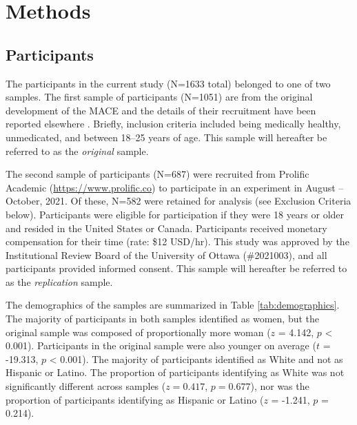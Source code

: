 \documentclass[letterpaper,man,natbib,longtable,floatsintext,12pt]{apa6}
\begin{document}
\section{Methods}

\subsection{Participants}

The participants in the current study (N=1633 total) belonged to one of two samples. The first sample of participants (N=1051) are from the original development of the MACE and the details of their recruitment have been reported elsewhere \citep{teicher2015maltreatment}. Briefly, inclusion criteria included being medically healthy, unmedicated, and between 18–25 years of age. This sample will hereafter be referred to as the \textit{original} sample. 

The second sample of participants (N=687) were recruited from Prolific Academic (\url{https://www.prolific.co}) to participate in an experiment in August -- October, 2021. Of these, N=582 were retained for analysis (see Exclusion Criteria below). Participants were eligible for participation if they were 18 years or older and resided in the United States or Canada. Participants received monetary compensation for their time (rate: \$12 USD/hr). This study was approved by the Institutional Review Board of the University of Ottawa (\#2021003), and all participants provided informed consent. This sample will hereafter be referred to as the \textit{replication} sample. 

The demographics of the samples are summarized in Table \ref{tab:demographics}. The majority of participants in both samples identified as women, but the original sample was composed of proportionally more woman ($z$ = 4.142, $p$ < 0.001). Participants in the original sample were also younger on average ($t$ = -19.313, $p$ < 0.001). The majority of participants identified as White and not as Hispanic or Latino. The proportion of participants identifying as White was not significantly different across samples ($z = 0.417$, $p = 0.677$), nor was the proportion of participants identifying as Hispanic or Latino ($z$ = -1.241, $p$ = 0.214).
\end{document}
